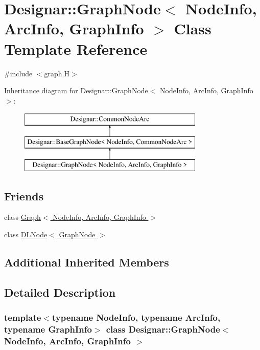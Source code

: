 \hypertarget{class_designar_1_1_graph_node}{}\section{Designar\+:\+:Graph\+Node$<$ Node\+Info, Arc\+Info, Graph\+Info $>$ Class Template Reference}
\label{class_designar_1_1_graph_node}


{\ttfamily \#include $<$graph.\+H$>$}

Inheritance diagram for Designar\+:\+:Graph\+Node$<$ Node\+Info, Arc\+Info, Graph\+Info $>$\+:\begin{figure}[H]
\begin{center}
\leavevmode
\includegraphics[height=3.000000cm]{class_designar_1_1_graph_node}
\end{center}
\end{figure}
\subsection*{Friends}
\begin{DoxyCompactItemize}
\item 
class \hyperlink{class_designar_1_1_graph_node_a0a9834688687d864501bbb9c85b0d32c}{Graph$<$ Node\+Info, Arc\+Info, Graph\+Info $>$}
\item 
class \hyperlink{class_designar_1_1_graph_node_a5d0e7b51039a0eb5cfdfdb2f3701f06d}{D\+L\+Node$<$ Graph\+Node $>$}
\end{DoxyCompactItemize}
\subsection*{Additional Inherited Members}


\subsection{Detailed Description}
\subsubsection*{template$<$typename Node\+Info, typename Arc\+Info, typename Graph\+Info$>$\newline
class Designar\+::\+Graph\+Node$<$ Node\+Info, Arc\+Info, Graph\+Info $>$}



